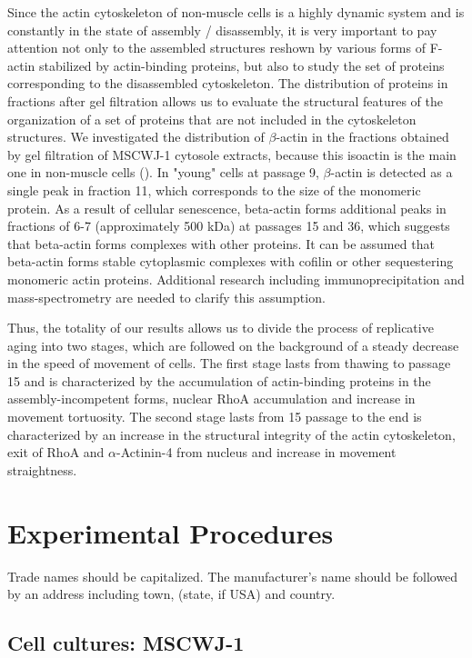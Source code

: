 \documentclass[alpha-refs]{wiley-article}
\begin{document}
Since the actin cytoskeleton of non-muscle cells is a highly dynamic system and is constantly in the state of assembly / disassembly, it is very important to pay attention not only to the assembled structures reshown by various forms of F-actin stabilized by actin-binding proteins, but also to study the set of proteins corresponding to the disassembled cytoskeleton.
The distribution of proteins in fractions after gel filtration allows us to evaluate the structural features of the organization of a set of proteins that are not included in the cytoskeleton structures.
We investigated the distribution of $\beta$-actin in the fractions obtained by gel filtration of MSCWJ-1 cytosole extracts, because this isoactin is the main one in non-muscle cells (\cite{khaitlina2001functional}).
In "young" cells at passage 9, $\beta$-actin is detected as a single peak in fraction 11, which corresponds to the size of the monomeric protein.
As a result of cellular senescence, beta-actin forms additional peaks in fractions of 6-7 (approximately 500 kDa) at passages 15 and 36, which suggests that beta-actin forms complexes with other proteins.
It can be assumed that beta-actin forms stable cytoplasmic complexes with cofilin or other sequestering monomeric actin proteins.
Additional research including immunoprecipitation and mass-spectrometry are needed to clarify this assumption.

Thus, the totality of our results allows us to divide the process of replicative aging into two stages, which are followed on the background of a steady decrease in the speed of movement of cells.
The first stage lasts from thawing to passage 15 and is characterized by the accumulation of actin-binding proteins in the assembly-incompetent forms, nuclear RhoA accumulation and increase in movement tortuosity.
The second stage lasts from 15 passage to the end is characterized by an increase in the structural integrity of the actin cytoskeleton, exit of RhoA and $\alpha$-Actinin-4 from nucleus and increase in movement straightness.

\section{Experimental Procedures}

Trade names should be capitalized. The manufacturer's name should be followed by an address including town, (state, if USA) and country.

\subsection{Cell cultures: MSCWJ-1}
\end{document}
